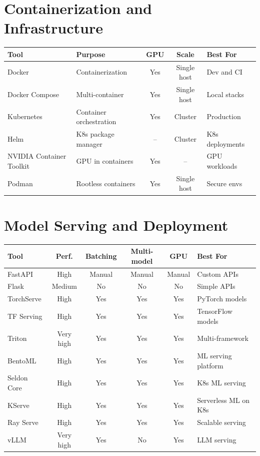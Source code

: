 \section{Containerization and Infrastructure}
\label{app:container-tools}

\begin{center}
\begin{tabular}{@{}lp{3.5cm}ccp{4cm}@{}}
\toprule
\textbf{Tool} & \textbf{Purpose} & \textbf{GPU} &
  \textbf{Scale} & \textbf{Best For} \\
\midrule
Docker & Containerization & Yes & Single host & Dev and CI \\
Docker Compose & Multi-container & Yes & Single host & Local stacks \\
Kubernetes & Container orchestration & Yes & Cluster & Production \\
Helm & K8s package manager & -- & Cluster & K8s deployments \\
NVIDIA Container Toolkit & GPU in containers & Yes & -- & GPU workloads \\
Podman & Rootless containers & Yes & Single host & Secure envs \\
\bottomrule
\end{tabular}
\end{center}

\section{Model Serving and Deployment}
\label{app:serving-tools}

\begin{center}
\begin{tabular}{@{}lccccp{3cm}@{}}
\toprule
\textbf{Tool} & \textbf{Perf.} & \textbf{Batching} &
  \textbf{Multi-model} & \textbf{GPU} & \textbf{Best For} \\
\midrule
FastAPI & High & Manual & Manual & Manual & Custom APIs \\
Flask & Medium & No & No & No & Simple APIs \\
TorchServe & High & Yes & Yes & Yes & PyTorch models \\
TF Serving & High & Yes & Yes & Yes & TensorFlow models \\
Triton & Very high & Yes & Yes & Yes & Multi-framework \\
BentoML & High & Yes & Yes & Yes & ML serving platform \\
Seldon Core & High & Yes & Yes & Yes & K8s ML serving \\
KServe & High & Yes & Yes & Yes & Serverless ML on K8s \\
Ray Serve & High & Yes & Yes & Yes & Scalable serving \\
vLLM & Very high & Yes & No & Yes & LLM serving \\
\bottomrule
\end{tabular}
\end{center}

